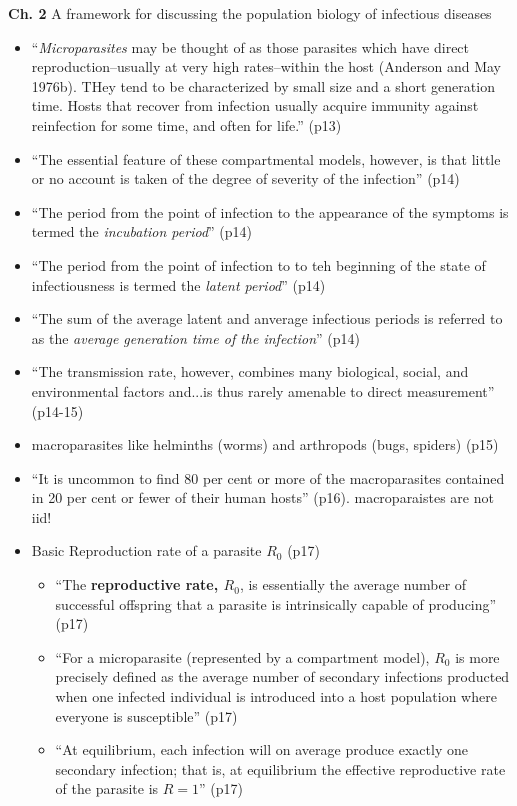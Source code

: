 \message{ !name(refs.tex)}\documentclass{article}
\begin{document}
\textbf{Ch. 2} A framework for discussing the population biology of infectious diseases
\begin{itemize}
\item ``\textit{Microparasites} may be thought of as those parasites which have direct reproduction--usually at very high rates--within the host (Anderson and May 1976b).  THey tend to be characterized by small size and a short generation time.  Hosts that recover from infection usually acquire immunity against reinfection for some time, and often for life.'' (p13)
\item ``The essential feature of these compartmental models, however, is that little or no account is taken of the degree of severity of the infection'' (p14)
\item ``The period from the point of infection to the appearance of the symptoms is termed the \textit{incubation period}'' (p14)
\item ``The period from the point of infection to to teh beginning of the state of infectiousness is termed the \textit{latent period}'' (p14)
\item ``The sum of the average latent and anverage infectious periods is referred to as the \textit{average generation time of the infection}'' (p14)
\item ``The transmission rate, however, combines many biological, social, and environmental factors and...is thus rarely amenable to direct measurement'' (p14-15)
\item macroparasites like helminths (worms) and arthropods (bugs, spiders) (p15)
\item ``It is uncommon to find 80 per cent or more of the macroparasites contained in 20 per cent or fewer of their human hosts'' (p16).  macroparaistes are not iid!
\item Basic Reproduction rate of a parasite $R_0$ (p17)
  \begin{itemize}
  \item ``The \textbf{reproductive rate, $R_0$}, is essentially the average number of successful offspring that a parasite is intrinsically capable of producing'' (p17)
  \item ``For a microparasite (represented by a compartment model), $R_0$ is more precisely defined as the average number of secondary infections producted when one infected individual is introduced into a host population where everyone is susceptible'' (p17)
  \item ``At equilibrium, each infection will on average produce exactly one secondary infection; that is, at equilibrium the effective reproductive rate of the parasite is $R=1$'' (p17)

\end{itemize}
\end{itemize}
\end{document}
